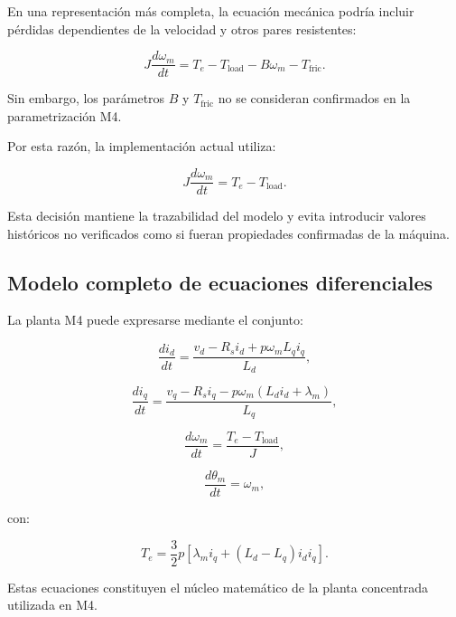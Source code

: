 En una representación más completa, la ecuación mecánica podría incluir pérdidas dependientes de la velocidad y otros pares resistentes:

\begin{equation}
J\frac{d\omega_m}{dt}
=
T_e
-
T_{\mathrm{load}}
-
B\omega_m
-
T_{\mathrm{fric}}.
\end{equation}

Sin embargo, los parámetros $B$ y $T_{\mathrm{fric}}$ no se consideran confirmados en la parametrización M4.

Por esta razón, la implementación actual utiliza:

\begin{equation}
J\frac{d\omega_m}{dt}
=
T_e-T_{\mathrm{load}}.
\end{equation}

Esta decisión mantiene la trazabilidad del modelo y evita introducir valores históricos no verificados como si fueran propiedades confirmadas de la máquina.

\subsection{Modelo completo de ecuaciones diferenciales}

La planta M4 puede expresarse mediante el conjunto:

\begin{equation}
\frac{di_d}{dt}
=
\frac{
v_d-R_si_d+p\omega_mL_qi_q
}{L_d},
\end{equation}

\begin{equation}
\frac{di_q}{dt}
=
\frac{
v_q-R_si_q-p\omega_m(L_di_d+\lambda_m)
}{L_q},
\end{equation}

\begin{equation}
\frac{d\omega_m}{dt}
=
\frac{
T_e-T_{\mathrm{load}}
}{J},
\end{equation}

\begin{equation}
\frac{d\theta_m}{dt}
=
\omega_m,
\end{equation}

con:

\begin{equation}
T_e
=
\frac{3}{2}p
\left[
\lambda_mi_q+
(L_d-L_q)i_di_q
\right].
\end{equation}

Estas ecuaciones constituyen el núcleo matemático de la planta concentrada utilizada en M4.


